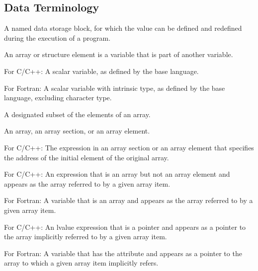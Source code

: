 \subsection{Data Terminology}
\label{subsec:Data Terminology} 
\glossarydefstart
A named data storage block, for which the value can be defined and redefined during the 
execution of a program.

\begin{adjustwidth}{-0.75in}{0in}
\begin{note}
An array or structure element is a variable that is part of another variable.
\end{note}
\end{adjustwidth}
\glossarydefend

\glossarydefstart
For C/C++:
\nopagebreak
A scalar variable, as defined by the base language.

For Fortran:
\nopagebreak
A scalar variable with intrinsic type, as defined by the base language,
excluding character type.
\glossarydefend


\glossarydefstart
A designated subset of the elements of an array.
\glossarydefend

\glossarydefstart
An array, an array section, or an array element.
\glossarydefend

\glossarydefstart
For C/C++: The expression in an array section or an array element that specifies
the address of the initial element of the original array.
\glossarydefend

\glossarydefstart
For C/C++:
\nopagebreak
An expression that is an array but not an array element and appears as the
array referred to by a given array item.

For Fortran:
\nopagebreak
A variable that is an array and appears as the array referred to by a given
array item.
\glossarydefend

\glossarydefstart
For C/C++:
\nopagebreak
An lvalue expression that is a pointer and appears as a pointer to the array
implicitly referred to by a given array item.

For Fortran:
\nopagebreak
A variable that has the  attribute and appears as a pointer to
the array to which a given array item implicitly refers.

